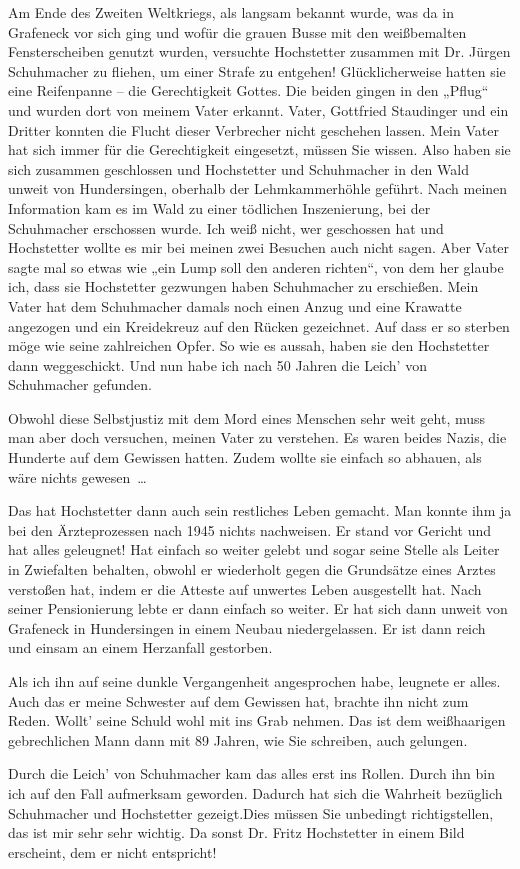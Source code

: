 Am Ende des Zweiten Weltkriegs, als langsam bekannt wurde, was da in Grafeneck
vor sich ging und wofür die grauen Busse mit den weißbemalten %
Fensterscheiben genutzt wurden, versuchte Hochstetter zusammen mit Dr. Jürgen
Schuhmacher zu fliehen, um einer Strafe zu entgehen! Glücklicherweise hatten
sie eine Reifenpanne – die Gerechtigkeit Gottes. Die beiden gingen in den
„Pflug“ und wurden dort von meinem Vater erkannt. Vater, Gottfried Staudinger
und ein Dritter konnten die Flucht dieser Verbrecher nicht geschehen lassen.
Mein Vater hat sich immer für die Gerechtigkeit eingesetzt, müssen Sie wissen.
Also haben sie sich zusammen geschlossen und Hochstetter und Schuhmacher in den
Wald unweit von Hundersingen, oberhalb der Lehmkammerhöhle geführt. Nach meinen
Information kam es im Wald zu einer tödlichen Inszenierung, bei der Schuhmacher
erschossen wurde. Ich weiß nicht, wer geschossen hat und Hochstetter wollte es
mir bei meinen zwei Besuchen auch nicht sagen. Aber Vater sagte mal so etwas
wie „ein Lump soll den anderen richten“, von dem her glaube ich, dass sie
Hochstetter gezwungen haben Schuhmacher zu erschießen. Mein Vater hat dem
Schuhmacher damals noch einen Anzug und eine Krawatte angezogen und ein
Kreidekreuz auf den Rücken gezeichnet. Auf dass er so sterben möge wie seine
zahlreichen Opfer. So wie es aussah, haben sie den Hochstetter dann
weggeschickt. Und nun habe ich nach 50 Jahren die Leich’ von Schuhmacher
gefunden.

Obwohl diese Selbstjustiz mit dem Mord eines Menschen sehr weit geht, muss man
aber doch versuchen, meinen Vater zu verstehen. Es waren beides Nazis, die
Hunderte auf dem Gewissen hatten. Zudem wollte sie einfach so abhauen, als wäre
nichts gewesen~…

Das hat Hochstetter dann auch sein restliches Leben gemacht. Man konnte ihm ja
bei den Ärzteprozessen nach 1945 nichts nachweisen. Er stand vor Gericht und
hat alles geleugnet! Hat einfach so weiter gelebt und sogar seine Stelle als
Leiter in Zwiefalten behalten, obwohl er wiederholt gegen die Grundsätze eines
Arztes verstoßen hat, indem er die Atteste auf unwertes Leben ausgestellt hat.
Nach seiner Pensionierung lebte er dann einfach so weiter. Er hat sich dann
unweit von Grafeneck in Hundersingen in einem Neubau niedergelassen. Er ist
dann reich und einsam an einem Herzanfall gestorben.

Als ich ihn auf seine dunkle Vergangenheit angesprochen habe, leugnete er
alles. Auch das er meine Schwester auf dem Gewissen hat, brachte ihn nicht zum
Reden. Wollt’ seine Schuld wohl mit ins Grab nehmen. Das ist dem weißhaarigen
gebrechlichen Mann dann mit 89 Jahren, %
wie Sie schreiben, auch gelungen.

Durch die Leich’ von Schuhmacher kam das alles erst ins Rollen. Durch ihn bin
ich auf den Fall aufmerksam geworden. Dadurch hat sich die Wahrheit bezüglich
Schuhmacher und Hochstetter gezeigt.Dies müssen Sie unbedingt richtigstellen,
das ist mir sehr sehr wichtig. Da sonst Dr. Fritz Hochstetter in einem Bild
erscheint, dem er nicht entspricht!
